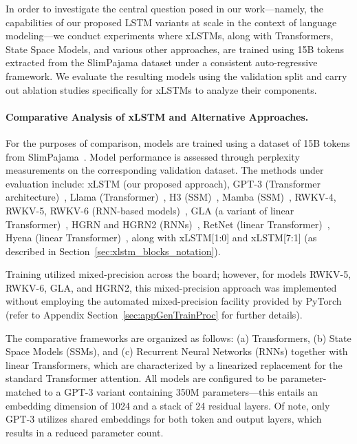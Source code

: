 In order to investigate the central question posed in our work—namely, the capabilities of our proposed LSTM variants at scale in the context of language modeling—we conduct experiments where xLSTMs, along with Transformers, State Space Models, and various other approaches, are trained using 15B tokens extracted from the SlimPajama dataset under a consistent auto-regressive framework. We evaluate the resulting models using the validation split and carry out ablation studies specifically for xLSTMs to analyze their components.

\paragraph{Comparative Analysis of xLSTM and Alternative Approaches.} For the purposes of comparison, models are trained using a dataset of 15B tokens from SlimPajama~\citep{Soboleva:23}. Model performance is assessed through perplexity measurements on the corresponding validation dataset. The methods under evaluation include: xLSTM (our proposed approach), GPT-3 (Transformer architecture)~\citep{Brown:20short}, Llama (Transformer)~\citep{Touvron:23arxiv}, H3 (SSM)~\citep{Fu:23}, Mamba (SSM)~\citep{Gu:24arxiv}, RWKV-4, RWKV-5, RWKV-6 (RNN-based models)~\citep{Peng:23arxivshort, Peng:24arxivshort}, GLA (a variant of linear Transformer)~\citep{Yang:23arxiv}, HGRN and HGRN2 (RNNs)~\citep{Qin:23, Qin:24arxiv}, RetNet (linear Transformer)~\citep{Sun:23arxiv}, Hyena (linear Transformer)~\citep{Poli:23}, along with xLSTM[1:0] and xLSTM[7:1] (as described in Section~\ref{sec:xlstm_blocks_notation}). 

Training utilized mixed-precision across the board; however, for models RWKV-5, RWKV-6, GLA, and HGRN2, this mixed-precision approach was implemented without employing the automated mixed-precision facility provided by PyTorch (refer to Appendix Section~\ref{sec:appGenTrainProc} for further details). 

The comparative frameworks are organized as follows: (a) Transformers, (b) State Space Models (SSMs), and (c) Recurrent Neural Networks (RNNs) together with linear Transformers, which are characterized by a linearized replacement for the standard Transformer attention. All models are configured to be parameter-matched to a GPT-3 variant containing 350M parameters—this entails an embedding dimension of 1024 and a stack of 24 residual layers. Of note, only GPT-3 utilizes shared embeddings for both token and output layers, which results in a reduced parameter count.

